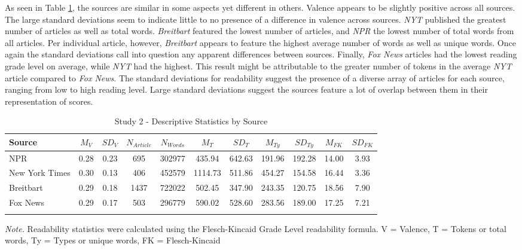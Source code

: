 \documentclass[
  man,floatsintext]{apa6}
\begin{document}
As seen in Table \ref{tab:exp1-source-descriptives}, the sources are
similar in some aspects yet different in others. Valence appears to be
slightly positive across all sources. The large standard deviations seem
to indicate little to no presence of a difference in valence across
sources. \emph{NYT} published the greatest number of articles as well as
total words. \emph{Breitbart} featured the lowest number of articles, and
\emph{NPR} the lowest number of total words from all articles. Per individual
article, however, \emph{Breitbart} appears to feature the highest average
number of words as well as unique words. Once again the standard
deviations call into question any apparent differences between sources.
Finally, \emph{Fox News} articles had the lowest reading grade level on
average, while \emph{NYT} had the highest. This result might be attributable
to the greater number of tokens in the average \emph{NYT} article compared to
\emph{Fox News}. The standard deviations for readability suggest the presence
of a diverse array of articles for each source, ranging from low to high
reading level. Large standard deviations suggest the sources feature a
lot of overlap between them in their representation of scores.

\begin{table}[h]

\begin{center}
\begin{threeparttable}

\caption{\label{tab:exp1-source-descriptives}Study 2 - Descriptive Statistics by Source}

\footnotesize{

\begin{tabular}{lcccccccccc}
\toprule
Source & $M_V$ & $SD_V$ & $N_{Article}$ & $N_{Words}$ & $M_T$ & $SD_T$ & $M_{Ty}$ & $SD_{Ty}$ & $M_{FK}$ & $SD_{FK}$\\
\midrule
NPR & 0.28 & 0.23 & 695 & 302977 & 435.94 & 642.63 & 191.96 & 192.28 & 14.00 & 3.93\\
New York Times & 0.30 & 0.13 & 406 & 452579 & 1114.73 & 511.86 & 454.27 & 154.58 & 16.44 & 3.36\\
Breitbart & 0.29 & 0.18 & 1437 & 722022 & 502.45 & 347.90 & 243.35 & 120.75 & 18.56 & 7.90\\
Fox News & 0.29 & 0.17 & 503 & 296779 & 590.02 & 528.60 & 283.56 & 189.00 & 17.25 & 7.21\\
\bottomrule
\addlinespace
\end{tabular}

}

\begin{tablenotes}[para]
\normalsize{\textit{Note.} Readability statistics were calculated using the Flesch-Kincaid Grade Level readability formula. V = Valence, T = Tokens or total words, Ty = Types or unique words, FK = Flesch-Kincaid}
\end{tablenotes}

\end{threeparttable}
\end{center}

\end{table}
\end{document}
